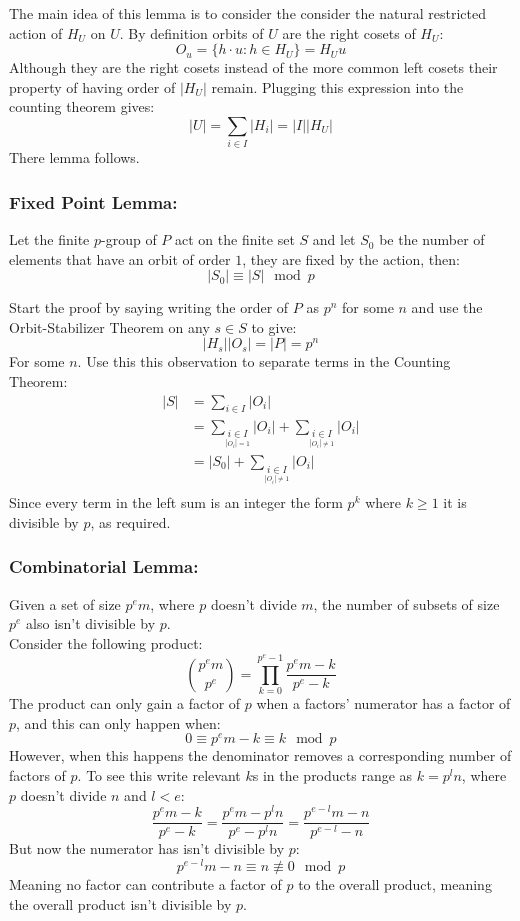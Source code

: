 The main idea of this lemma is to consider the consider the natural restricted action of $H_U$ on $U$.
By definition orbits of $U$ are the right cosets of $H_U$:
\[O_u = \{h\cdot u: h\in H_U\} = H_Uu\]
Although they are the right cosets instead of the more common left cosets their property of having order of $|H_U|$ remain.
Plugging this expression into the counting theorem gives:
\[|U| = \sum_{i\in I}|H_i| = |I||H_U|\]
There lemma follows.

\subsubsection{Fixed Point Lemma:}
Let the finite $p$-group of $P$ act on the finite set $S$ and let $S_0$ be the number of elements that have an orbit of order $1$,
they are fixed by the action,
then:
\[|S_0|\equiv|S|\mod p\]

Start the proof by saying writing the order of $P$ as $p^n$ for some $n$ and use the Orbit-Stabilizer Theorem on any $s\in S$ to give:
\[|H_s||O_s|=|P|=p^n\]
For some $n$.
Use this this observation to separate terms in the Counting Theorem:
\[\begin{aligned}
	|S| &= \sum_{i\in I}|O_i|\\
	&=\sum_{\underset{|O_i|=1}{i\in I}}|O_i|+\sum_{\underset{|O_i|\neq1}{i\in I}}|O_i|\\
	&=|S_0|+\sum_{\underset{|O_i|\neq1}{i\in I}}|O_i|\\
\end{aligned}\]
Since every term in the left sum is an integer the form $p^k$ where $k\geq 1$ it is divisible by $p$,
as required.

\subsubsection{Combinatorial Lemma:}
Given a set of size $p^em$,
where $p$ doesn't divide $m$,
the number of subsets of size $p^e$ also isn't divisible by $p$.
\\

Consider the following product:
\[\binom{p^em}{p^e} = \prod_{k=0}^{p^e-1}\frac{p^em-k}{p^e-k}\]
The product can only gain a factor of $p$ when a factors' numerator has a factor of $p$,
and this can only happen when:
\[0\equiv p^em-k\equiv k\mod p \]
However, 
when this happens the denominator removes a corresponding number of factors of $p$.
To see this write relevant $k$s in the products range as $k=p^ln$,
where $p$ doesn't divide $n$ and $l<e$:
\[\frac{p^em-k}{p^e-k} = \frac{p^em-p^ln}{p^e-p^ln}=\frac{p^{e-l}m-n}{p^{e-l}-n}\]
But now the numerator has isn't divisible by $p$:
\[p^{e-l}m-n\equiv n \not\equiv 0\mod p\]
Meaning no factor can contribute a factor of $p$ to the overall product,
meaning the overall product isn't divisible by $p$.
\\

